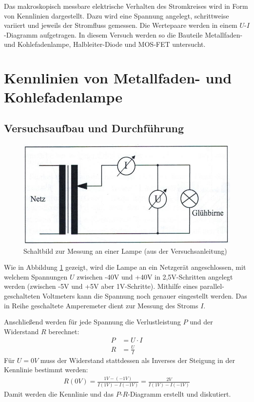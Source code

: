 \documentclass{scrartcl}
\begin{document}
Das makroskopisch messbare elektrische Verhalten des Stromkreises wird in Form von Kennlinien dargestellt. Dazu wird eine Spannung angelegt, schrittweise variiert und jeweils der Stromfluss gemessen. Die Wertepaare werden in einem $U$-$I$-Diagramm aufgetragen. In diesem Versuch werden so die Bauteile Metallfaden- und Kohlefadenlampe, Halbleiter-Diode und MOS-FET untersucht.




\pagebreak
\section{Kennlinien von Metallfaden- und Kohlefadenlampe}
\subsection{Versuchsaufbau und Durchführung}

\begin{figure}[H]
  \centering
    \includegraphics[scale=0.75]{Aufbau1.JPG}
  \caption{Schaltbild zur Messung an einer Lampe (aus der Versuchsanleitung)}
  \label{fig:Aufbau1}
\end{figure}

Wie in Abbildung \ref{fig:Aufbau1} gezeigt, wird die Lampe an ein Netzgerät angeschlossen, mit welchem Spannungen $U$ zwischen -40V und +40V in 2,5V-Schritten angelegt werden (zwischen -5V und +5V aber 1V-Schritte). Mithilfe eines parallel-geschalteten Voltmeters kann die Spannung noch genauer eingestellt werden. Das in Reihe geschaltete Amperemeter dient zur Messung des Stroms $I$.

Anschließend werden für jede Spannung die Verlustleistung $P$ und der Widerstand $R$ berechnet:
\begin{align}
P &= U \cdot I \\
R &= \frac{U}{I}
\end{align}
Für $U = 0V$ muss der Widerstand stattdessen als Inverses der Steigung in der Kennlinie bestimmt werden:
\begin{align}
R(0V) = \frac{1V-(-1V)}{I(1V)-I(-1V)} = \frac{2V}{I(1V)-I(-1V)}
\end{align}
Damit werden die Kennlinie und das $P$-$R$-Diagramm erstellt und diskutiert.
\end{document}
